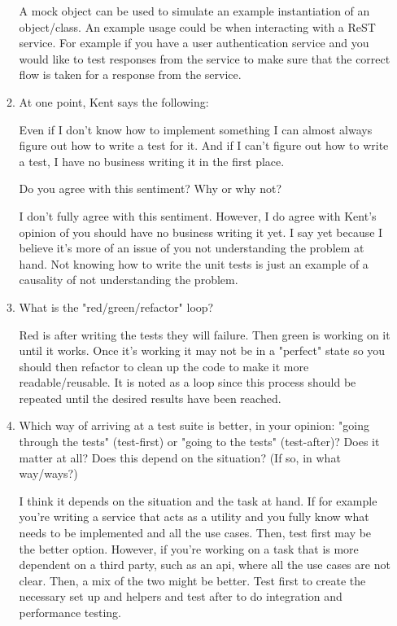 \begin{enumerate}
\begin{enumerate}
				A mock object can be used to simulate an example instantiation of an object/class.  An example usage could be when interacting with a ReST service. For example if you have a user authentication service and you would like to test responses from the service to make sure that the correct flow is taken for a response from the service.

			\item At one point, Kent says the following:
				
				Even if I don't know how to implement something I can almost always figure out how to write a test for it. And if I can't figure out how to write a test, I have no business writing it in the first place.

				Do you agree with this sentiment? Why or why not?
				
				I don't fully agree with this sentiment.  However, I do agree with Kent's opinion of you should have no business writing it yet.  I say yet because I believe it's more of an issue of you not understanding the problem at hand.  Not knowing how to write the unit tests is just an example of a causality of not understanding the problem.

			\item What is the "red/green/refactor" loop?
				
				Red is after writing the tests they will failure. Then green is working on it until it works.  Once it's working it may not be in a "perfect" state so you should then refactor to clean up the code to make it more readable/reusable.  It is noted as a loop since this process should be repeated until the desired results have been reached.

			\item Which way of arriving at a test suite is better, in your opinion: "going through the tests" (test-first) or "going to the tests" (test-after)? Does it matter at all? Does this depend on the situation? (If so, in what way/ways?)
				
				I think it depends on the situation and the task at hand.  If for example you're writing a service that acts as a utility and you fully know what needs to be implemented and all the use cases.  Then, test first may be the better option.  However, if you're working on a task that is more dependent on a third party, such as an api, where all the use cases are not clear.  Then, a mix of the two might be better.  Test first to create the necessary set up and helpers and test after to do integration and performance testing.


\end{enumerate}
\end{enumerate}
